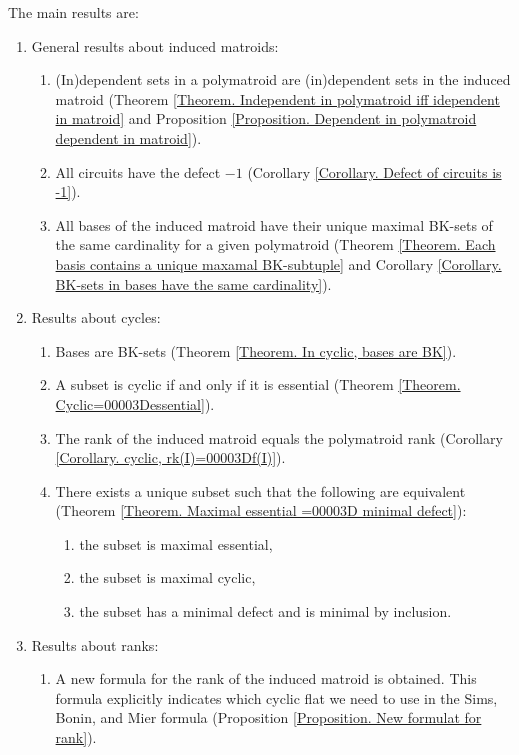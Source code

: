 \documentclass[11pt]{article}
\theoremstyle{plain}
\theoremstyle{definition}
\theoremstyle{remark}
\theoremstyle{plain}
\theoremstyle{plain}
\theoremstyle{plain}
\theoremstyle{definition}
\begin{document}
The main results are:
\begin{enumerate}
\item General results about induced matroids:
\begin{enumerate}
\item (In)dependent sets in a polymatroid are (in)dependent sets in the
induced matroid (Theorem \ref{Theorem. Independent in polymatroid iff idependent in matroid}
and Proposition \ref{Proposition. Dependent in polymatroid dependent in matroid}).
\item All circuits have the defect $-1$ (Corollary \ref{Corollary. Defect of circuits is -1}).
\item All bases of the induced matroid have their unique maximal BK-sets
of the same cardinality for a given polymatroid (Theorem \ref{Theorem. Each basis contains a unique maxamal BK-subtuple}
and Corollary \ref{Corollary. BK-sets in bases have the same cardinality}).
\end{enumerate}
\item Results about cycles:
\begin{enumerate}
\item Bases are BK-sets (Theorem \ref{Theorem. In cyclic, bases are BK}).
\item A subset is cyclic if and only if it is essential (Theorem \ref{Theorem. Cyclic=00003Dessential}).
\item The rank of the induced matroid equals the polymatroid rank (Corollary
\ref{Corollary. cyclic, rk(I)=00003Df(I)}).
\item There exists a unique subset such that the following are equivalent
(Theorem \ref{Theorem. Maximal essential =00003D minimal defect}):
\begin{enumerate}
\item the subset is maximal essential,
\item the subset is maximal cyclic,
\item the subset has a minimal defect and is minimal by inclusion.
\end{enumerate}
\end{enumerate}
\item Results about ranks:
\begin{enumerate}
\item A new formula for the rank of the induced matroid is obtained. This
formula explicitly indicates which cyclic flat we need to use in the
Sims, Bonin, and Mier formula \cite{sims_problems_1980,bonin_lattice_2008}
(Proposition \ref{Proposition. New formulat for rank}). 

\end{enumerate}
\end{enumerate}
\end{document}
